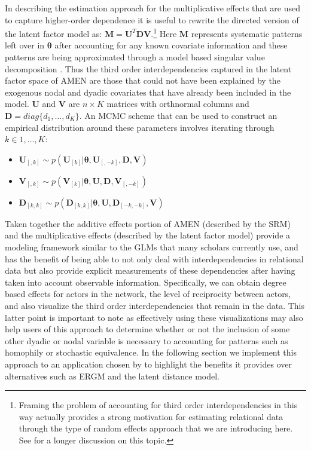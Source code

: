 In describing the estimation approach for the multiplicative effects that are used to capture higher-order dependence it is useful to rewrite the directed version of the latent factor model as: $\mathbf{M} = \mathbf{U}^{T} \mathbf{D} \mathbf{V}$.\footnote{Framing the problem of accounting for third order interdependencies in this way actually provides a strong motivation for estimating relational data through the type of random effects approach that we are introducing here. See \citet{hoff:2009} for a longer discussion on this topic.} Here $\mathbf{M}$ represents systematic patterns left over in $\bm\theta$ after accounting for any known covariate information and these patterns are being approximated through a model based singular value decomposition \citep{hoff:2009}. Thus the third order interdependencies captured in the latent factor space of AMEN are those that could not have been explained by the exogenous nodal and dyadic covariates that   have already been included in the model. $\mathbf{U}$ and $\mathbf{V}$ are $n \times K$ matrices with orthnormal columns and $\mathbf{D}=diag\{d_{1}, \ldots, d_{K}\}$. An MCMC scheme that can be used to construct an empirical distribution around these parameters involves iterating through $k \in 1, \ldots, K$:

\begin{itemize}
	\item $\mathbf{U}_{[,k]} \sim p( \mathbf{U}_{[k]} | \bm\theta , \mathbf{U}_{[,-k]}, \mathbf{D}, \mathbf{V} )$
	\item $\mathbf{V}_{[,k]} \sim p( \mathbf{V}_{[k]} | \bm\theta , \mathbf{U}, \mathbf{D}, \mathbf{V}_{[,-k]} )$
	\item $\mathbf{D}_{[k,k]} \sim p( \mathbf{D}_{[k,k]} | \bm\theta , \mathbf{U}, \mathbf{D}_{[-k,-k]}, \mathbf{V} )$
\end{itemize}

Taken together the additive effects portion of AMEN (described by the SRM) and the multiplicative effects (described by the latent factor model) provide a modeling framework similar to the GLMs that many scholars currently use, and has the benefit of being able to not only deal with interdependencies in relational data but also provide explicit measurements of these dependencies after having taken into account observable information. Specifically, we can obtain degree based effects for actors in the network, the level of reciprocity between actors, and also visualize the third order interdependencies that remain in the data. This latter point is important to note as effectively using these visualizations may also help users of this approach to determine whether or not the inclusion of some other dyadic or nodal variable is necessary to accounting for patterns such as homophily or stochastic equivalence. In the following section we implement this approach to an application chosen by \citet{cranmer:etal:2016} to highlight the benefits it provides over alternatives such as ERGM and the latent distance model.

